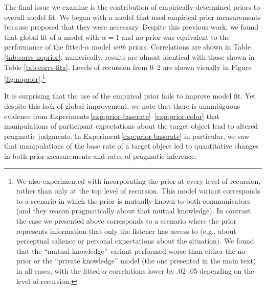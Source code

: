 \documentclass[man,noapacite]{apa2}
\newcounter{Experiment}
\newcommand{\exptref}[1]{Experiment\,\ref{#1}}
\newcommand{\exptrefrange}[2]{Experiments\,\ref{#1}--\ref{#2}}
\begin{document}
The final issue we examine is the contribution of empirically-determined priors to overall model fit. We began with a model that used empirical prior measurements because  proposed that they were necessary. Despite this previous work, we found that global fit of a model with $\alpha=1$ and no prior was equivalent to the performance of the fitted-$\alpha$ model \emph{with} priors. Correlations are shown in Table \ref{tab:corrs-noprior}; numerically, results are almost identical with those shown in Table \ref{tab:corrs-fita}. Levels of recursion from 0--2 are shown visually in Figure \ref{fig:noprior}.\footnote{We also experimented with incorporating the prior at every level of recursion, rather than only at the top level of recursion. This model variant corresponds to a scenario in which the prior is mutually-known to both communicators (and they reason pragmatically about that mutual knowledge). In contrast the case we presented above corresponds to a scenario where the prior represents information that only the listener has access to (e.g., about perceptual salience or personal expectations about the situation). We found that the ``mutual knowledge'' variant performed worse than either the no-prior or the ``private knowledge'' model (the one presented in the main text) in all cases, with the fitted-$\alpha$ correlations lower by .02-.05 depending on the level of recursion.}

It is surprising that the use of the empirical prior fails to improve model fit. Yet despite this lack of global improvement, we note that there is unambiguous evidence from \exptrefrange{exp:prior-baserate}{exp:prior-color} that manipulations of participant expectations about the target object lead to altered pragmatic judgments. In \exptref{exp:prior-baserate} in particular, we saw that manipulations of the base rate of a target object led to quantitative changes in both prior measurements and rates of pragmatic inference.
\end{document}

